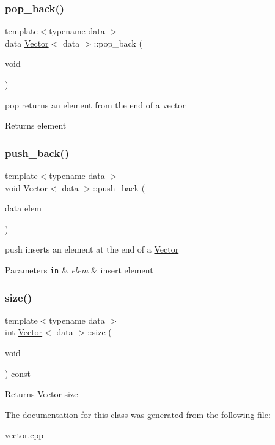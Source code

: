 \subsubsection{\texorpdfstring{pop\+\_\+back()}{pop\_back()}}
{\footnotesize\ttfamily template$<$typename data $>$ \\
data \hyperlink{classVector}{Vector}$<$ data $>$\+::pop\+\_\+back (\begin{DoxyParamCaption}\item[{void}]{ }\end{DoxyParamCaption})}



pop  returns an element from the end of a vector 

\begin{DoxyReturn}{Returns}
element 
\end{DoxyReturn}
\mbox{\label{classVector_a8e34f2f9943752507540bc80dba453fd}} 
\subsubsection{\texorpdfstring{push\+\_\+back()}{push\_back()}}
{\footnotesize\ttfamily template$<$typename data $>$ \\
void \hyperlink{classVector}{Vector}$<$ data $>$\+::push\+\_\+back (\begin{DoxyParamCaption}\item[{data}]{elem }\end{DoxyParamCaption})}



push  inserts an element at the end of a \hyperlink{classVector}{Vector} 


\begin{DoxyParams}[1]{Parameters}
\mbox{\tt in}  & {\em elem} & insert element \\
\hline
\end{DoxyParams}
\mbox{\label{classVector_a81b1d973485244101caf8e901b4a03d9}} 
\subsubsection{\texorpdfstring{size()}{size()}}
{\footnotesize\ttfamily template$<$typename data $>$ \\
int \hyperlink{classVector}{Vector}$<$ data $>$\+::size (\begin{DoxyParamCaption}\item[{void}]{ }\end{DoxyParamCaption}) const}

\begin{DoxyReturn}{Returns}
\hyperlink{classVector}{Vector} size 
\end{DoxyReturn}


The documentation for this class was generated from the following file\+:\begin{DoxyCompactItemize}
\item 
\hyperlink{vector_8cpp}{vector.\+cpp}\end{DoxyCompactItemize}
